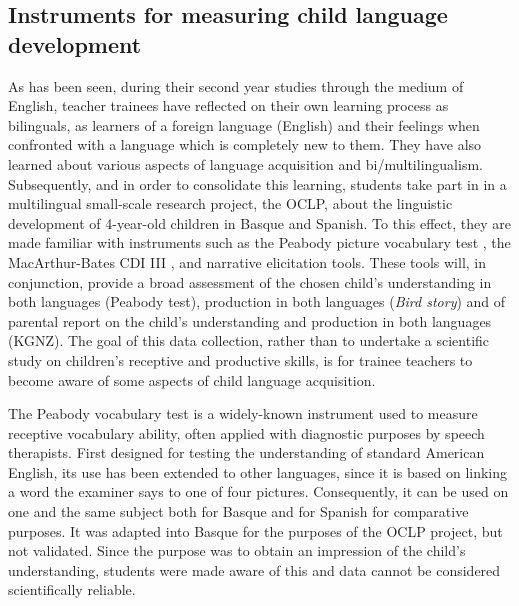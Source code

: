 \documentclass[output=paper]{../langscibook}
\begin{document}
\subsection{Instruments for measuring child language development}

As has been seen, during their second year studies through the medium of English, teacher trainees have reflected on their own learning process as bilinguals, as learners of a foreign language (English) and their feelings when confronted with a language which is completely new to them. They have also learned about various aspects of language acquisition and bi/multilingualism. Subsequently, and in order to consolidate this learning, students take part in in a multilingual small-scale research project, the OCLP, about the linguistic development of 4-year-old children in Basque and Spanish. To this effect, they are made familiar with instruments such as the Peabody picture vocabulary test \citep{DunnEtAl1986}, the MacArthur-Bates CDI III \citep{Dale2007}, and narrative elicitation tools. These tools will, in conjunction, provide a broad assessment of the chosen child's understanding in both languages (Peabody test), production in both languages (\emph{Bird story}) and of parental report on the child's understanding and production in both languages (KGNZ). The goal of this data collection, rather than to undertake a scientific study on children's receptive and productive skills, is for trainee teachers to become aware of some aspects of child language acquisition. 

The Peabody vocabulary test is a widely-known instrument used to measure receptive vocabulary ability, often applied with diagnostic purposes by speech therapists. First designed for testing the understanding of standard American English, its use has been extended to other languages, since it is based on linking a word the examiner says to one of four pictures. Consequently, it can be used on one and the same subject both for Basque and for Spanish for comparative purposes. It was adapted into Basque for the purposes of the OCLP project, but not validated. Since the purpose was to obtain an impression of the child's understanding, students were made aware of this and data cannot be considered scientifically reliable.
\end{document}
